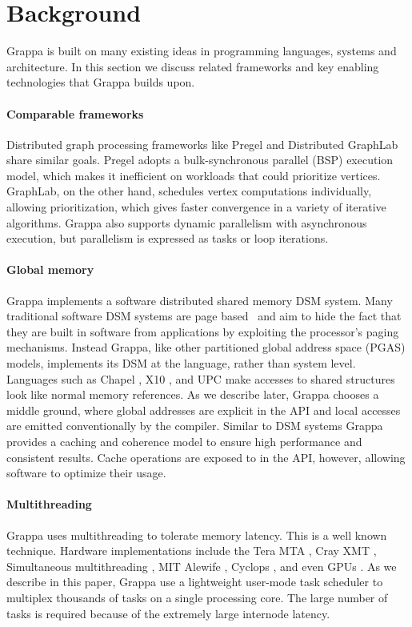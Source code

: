 \section{Background}

Grappa is built on many existing ideas in programming languages, systems and
architecture. In this section we discuss related frameworks and key enabling
technologies that Grappa builds upon.

\paragraph{Comparable frameworks}
Distributed graph processing frameworks like Pregel \cite{pregel:2010} and
Distributed GraphLab \cite{distgraphlab:vldb12} share similar goals. Pregel
adopts a bulk-synchronous parallel (BSP) execution model, which makes it
inefficient on workloads that could prioritize vertices. GraphLab, on the
other hand, schedules vertex computations individually, allowing
prioritization, which gives faster convergence in a variety of iterative
algorithms. Grappa also supports dynamic parallelism
with asynchronous execution, but parallelism is expressed as tasks or loop
iterations.

\paragraph{Global memory}
Grappa implements a software distributed shared memory DSM system. Many
traditional software DSM systems are page based~\cite{Treadmarks,munin} and
aim to hide the fact that they are built in software from applications by
exploiting the processor's paging mechanisms. Instead Grappa, like other
partitioned global address space (PGAS) models, implements its DSM at the
language, rather than system level. Languages such as Chapel \cite{Chapel},
X10 \cite{X10}, and UPC \cite{UPC} make accesses to shared structures look
like normal memory references. As we describe later, Grappa chooses a middle
ground, where global addresses are explicit in the API and local accesses are
emitted conventionally by the compiler. Similar to DSM systems Grappa provides
a caching and coherence model to ensure high performance and consistent
results. Cache operations are exposed to in the API, however, allowing
software to optimize their usage.

\paragraph{Multithreading}
Grappa uses multithreading to tolerate memory latency. This is a well known
technique. Hardware implementations include the Tera MTA \cite{Tera}, Cray XMT
\cite{XMT}, Simultaneous multithreading \cite{SMT}, MIT Alewife
\cite{Alewife}, Cyclops \cite{Cyclops}, and even GPUs \cite{fatahalian}. As we
describe in this paper, Grappa use a lightweight user-mode task scheduler to
multiplex thousands of tasks on a single processing core. The large number of
tasks is required because of the extremely large internode latency.
